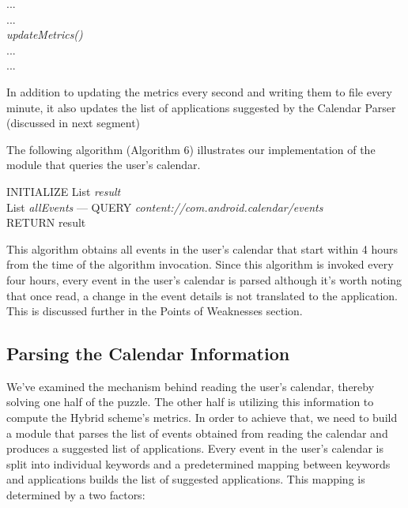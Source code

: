 \documentclass[12pt]{uthesis-v12}  %
\begin{document}
			\begin{algorithm}[H]
				\SetAlgoLined
				
				{	
					...\\
					...\\
					{\em updateMetrics()}\\
					...\\
					...\\	
				}
				
				\caption[Update Suggested Applications List]{In addition to updating the metrics every second and writing them to file every minute, it also updates the list of applications suggested by the Calendar Parser (discussed in next segment)}
			\end{algorithm}
			
			The following algorithm (Algorithm 6) illustrates our implementation of the module that queries the user's calendar.
			
			\begin{algorithm}[H]
				\SetAlgoLined
				INITIALIZE List {\em result}\\
				List {\em allEvents} ---  QUERY {\em content://com.android.calendar/events}\\
				{	
				}
				RETURN result
				\caption[Algorithm to read user's calendar]{This algorithm obtains all events in the user's calendar that start within 4 hours from the time of the algorithm invocation. Since this algorithm is invoked every four hours, every event in the user's calendar is parsed although it's worth noting that once read, a change in the event details is not translated to the application. This is discussed further in the Points of Weaknesses section.}
			\end{algorithm}
						
		\subsection{Parsing the Calendar Information}
			We've examined the mechanism behind reading the user's calendar, thereby solving one half of the puzzle. The other half is utilizing this information to compute the Hybrid scheme's metrics. In order to achieve that, we need to build a module that parses the list of events obtained from reading the calendar and produces a suggested list of applications. Every event in the user's calendar is split into individual keywords and a predetermined mapping between keywords and applications builds the list of suggested applications. This mapping is determined by a two factors:
			
\end{document}
